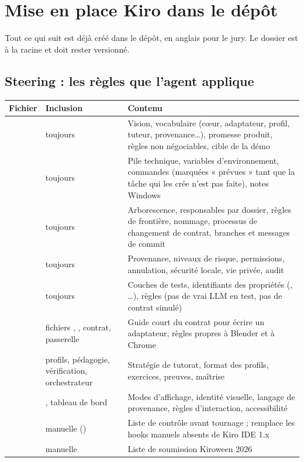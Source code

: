 \section{Mise en place Kiro dans le dépôt}

Tout ce qui suit est déjà créé dans le dépôt, en anglais pour le jury. Le dossier  est à la racine et doit rester versionné.

\subsection{Steering : les règles que l'agent applique}

{\small\setlength{\tabcolsep}{4pt}
\begin{xltabular}{\textwidth}{@{}L{3.5cm}L{2.6cm}Y@{}}
\toprule
\textbf{Fichier} & \textbf{Inclusion} & \textbf{Contenu} \\
\midrule
{} & toujours & Vision, vocabulaire (cœur, adaptateur, profil, tuteur, provenance\dots), promesse produit, règles non négociables, cible de la démo \\
 & toujours & Pile technique, variables d'environnement, commandes (marquées « prévues » tant que la tâche qui les crée n'est pas faite), notes Windows \\
 & toujours & Arborescence, responsables par dossier, règles de frontière, nommage, processus de changement de contrat, branches et messages de commit \\
 & toujours & Provenance, niveaux de risque, permissions, annulation, sécurité locale, vie privée, audit \\
 & toujours & Couches de tests, identifiants des propriétés (, \dots), règles (pas de vrai LLM en test, pas de contrat simulé) \\
 & fichiers , , contrat, passerelle & Guide court du contrat pour écrire un adaptateur, règles propres à Blender et à Chrome \\
 & profils, pédagogie, vérification, orchestrateur & Stratégie de tutorat, format des profils, exercices, preuves, maîtrise \\
 & , tableau de bord & Modes d'affichage, identité visuelle, langage de provenance, règles d'interaction, accessibilité \\
 & manuelle () & Liste de contrôle avant tournage ; remplace les hooks manuels absents de Kiro IDE 1.x \\
 & manuelle & Liste de soumission Kiroween 2026 \\
\bottomrule
\end{xltabular}}


